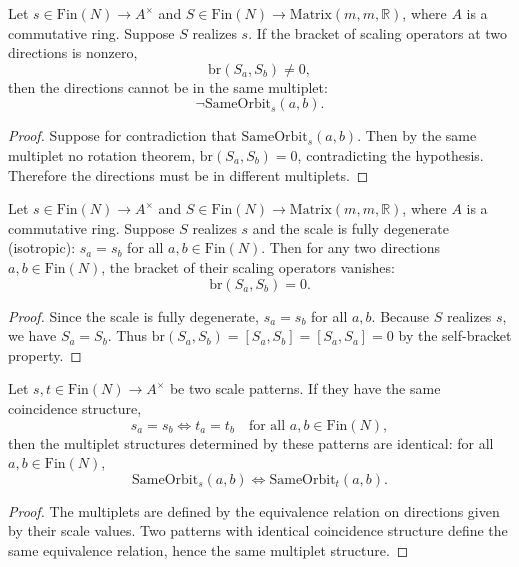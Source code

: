 \begin{theorem}
Let $s \in \text{Fin}(N) \to A^\times$ and $S \in \text{Fin}(N) \to \text{Matrix}(m, m, \mathbb{R})$, where $A$ is a commutative ring. Suppose $S$ realizes $s$. If the bracket of scaling operators at two directions is nonzero,
\[
\text{br}(S_a, S_b) \neq 0,
\]
then the directions cannot be in the same multiplet:
\[
\neg \text{SameOrbit}_s(a, b).
\]
\begin{proof}
Suppose for contradiction that $\text{SameOrbit}_s(a, b)$. Then by the same multiplet no rotation theorem, $\text{br}(S_a, S_b) = 0$, contradicting the hypothesis. Therefore the directions must be in different multiplets.
\end{proof}
\end{theorem}

\begin{theorem}
Let $s \in \text{Fin}(N) \to A^\times$ and $S \in \text{Fin}(N) \to \text{Matrix}(m, m, \mathbb{R})$, where $A$ is a commutative ring. Suppose $S$ realizes $s$ and the scale is fully degenerate (isotropic): $s_a = s_b$ for all $a, b \in \text{Fin}(N)$. Then for any two directions $a, b \in \text{Fin}(N)$, the bracket of their scaling operators vanishes:
\[
\text{br}(S_a, S_b) = 0.
\]
\begin{proof}
Since the scale is fully degenerate, $s_a = s_b$ for all $a, b$. Because $S$ realizes $s$, we have $S_a = S_b$. Thus $\text{br}(S_a, S_b) = [S_a, S_b] = [S_a, S_a] = 0$ by the self-bracket property.
\end{proof}
\end{theorem}

\begin{theorem}
Let $s, t \in \text{Fin}(N) \to A^\times$ be two scale patterns. If they have the same coincidence structure,
\[
s_a = s_b \iff t_a = t_b \quad \text{for all } a, b \in \text{Fin}(N),
\]
then the multiplet structures determined by these patterns are identical: for all $a, b \in \text{Fin}(N)$,
\[
\text{SameOrbit}_s(a, b) \iff \text{SameOrbit}_t(a, b).
\]
\begin{proof}
The multiplets are defined by the equivalence relation on directions given by their scale values. Two patterns with identical coincidence structure define the same equivalence relation, hence the same multiplet structure.
\end{proof}
\end{theorem}

